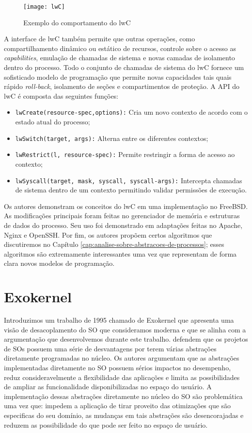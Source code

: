 \begin{figure}[!h]
  \centering
  \texttt{[image: lwC]} 
  \caption{Exemplo do comportamento do lwC}
  \label{fig:lwc} 
\end{figure}

A interface de lwC também permite que outras operações, como compartilhamento
dinâmico ou estático de recursos, controle sobre o acesso as
\emph{capabilities}, emulação de chamadas de sistema e novas camadas de
isolamento dentro do processo. Todo o conjunto de chamadas de sistema do lwC
fornece um sofisticado modelo de programação que permite novas capacidades
tais quais rápido \emph{roll-back}, isolamento de seções e compartimentos de
proteção. A API do lwC é composta das seguintes funções:

\begin{itemize}
  \item \texttt{lwCreate(resource-spec,options):} Cria um novo contexto de acordo com o estado atual do processo;
  \item \texttt{lwSwitch(target, args):} Alterna entre os diferentes contextos;
  \item \texttt{lwRestrict(l, resource-spec):} Permite restringir a forma de acesso ao contexto;
  \item \texttt{lwSyscall(target, mask, syscall, syscall-args):} Intercepta chamadas de sistema dentro de um contexto permitindo validar permissões de execução.
\end{itemize}

Os autores demonstram os conceitos do lwC em uma implementação no FreeBSD. As
modificações principais foram feitas no gerenciador de memória e estruturas de
dados do processo. Seu uso foi demonstrado em adaptações feitas no Apache,
Nginx e OpenSSH. Por fim, os autores propõem certos algoritmos que discutiremos
no Capítulo \ref{cap:analise-sobre-abstracoes-de-processos}; esses algoritmos
são extremamente interessantes uma vez que representam de forma clara novos
modelos de programação.

\section{Exokernel}
\label{sec:exokernel}

Introduzimos um trabalho de 1995 chamado de Exokernel que apresenta uma visão
de desacoplamento do SO que consideramos moderna e que se alinha com a
argumentação que desenvolvemos durante este trabalho. \citet{exokernel}
defendem que os projetos de SOs possuem uma série de desvantagens por terem
várias abstrações diretamente programadas no núcleo. Os autores argumentam que
as abstrações implementadas diretamente no SO possuem sérios impactos no
desempenho, reduz consideravelmente a flexibilidade das aplicações e limita as
possibilidades de ampliar as funcionalidade disponibilizadas no espaço do
usuário. A implementação dessas abstrações diretamente no núcleo do SO são
problemática uma vez que: impedem a aplicação de tirar proveito das otimizações
que são especificas do seu domínio, as mudanças em tais abstrações são
desencorajadas e reduzem as possibilidade do que pode ser feito no espaço de
usuário.

